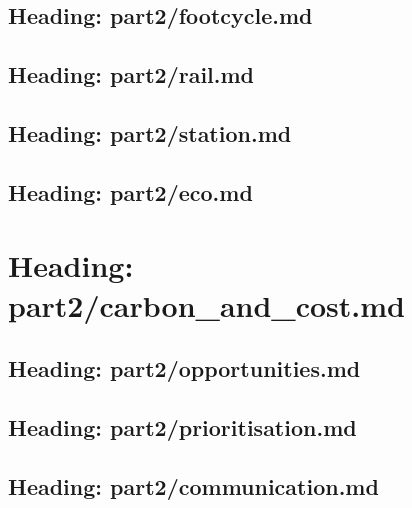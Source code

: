 \documentclass[letterpaper,10pt,english]{jupyterBook}
\begin{document}
\section{Heading: part2/footcycle.md}
\label{\detokenize{part2/footcycle:heading-part2-footcycle-md}}\label{\detokenize{part2/footcycle::doc}}
\sphinxstepscope


\section{Heading: part2/rail.md}
\label{\detokenize{part2/rail:heading-part2-rail-md}}\label{\detokenize{part2/rail::doc}}
\sphinxstepscope


\section{Heading: part2/station.md}
\label{\detokenize{part2/station:heading-part2-station-md}}\label{\detokenize{part2/station::doc}}
\sphinxstepscope


\section{Heading: part2/eco.md}
\label{\detokenize{part2/eco:heading-part2-eco-md}}\label{\detokenize{part2/eco::doc}}
\sphinxstepscope


\chapter{Heading: part2/carbon\_and\_cost.md}
\label{\detokenize{part2/carbon_and_cost:heading-part2-carbon-and-cost-md}}\label{\detokenize{part2/carbon_and_cost::doc}}
\sphinxstepscope


\section{Heading: part2/opportunities.md}
\label{\detokenize{part2/opportunities:heading-part2-opportunities-md}}\label{\detokenize{part2/opportunities::doc}}
\sphinxstepscope


\section{Heading: part2/prioritisation.md}
\label{\detokenize{part2/prioritisation:heading-part2-prioritisation-md}}\label{\detokenize{part2/prioritisation::doc}}
\sphinxstepscope


\section{Heading: part2/communication.md}
\label{\detokenize{part2/communication:heading-part2-communication-md}}\label{\detokenize{part2/communication::doc}}
\sphinxstepscope
\end{document}
